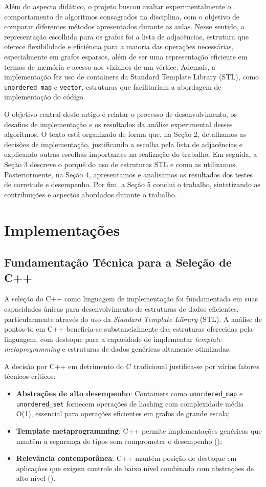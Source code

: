 \documentclass{sbc2023}%
\begin{document}
Além do aspecto didático, o projeto buscou avaliar experimentalmente o comportamento de algoritmos consagrados na disciplina, com o objetivo de comparar diferentes métodos apresentados durante as aulas. Nesse sentido, a representação escolhida para os grafos foi a lista de adjacências, estrutura que oferece flexibilidade e eficiência para a maioria das operações necessárias, especialmente em grafos esparsos, além de ser uma representação eficiente em termos de memória e acesso aos vizinhos de um vértice. Ademais, a implementação fez uso de containers da Standard Template Library (STL), como \texttt{unordered\_map} e \texttt{vector}, estruturas que facilitariam a abordagem de implementação do código.

O objetivo central deste artigo é relatar o processo de desenvolvimento, os desafios de implementação e os resultados da análise experimental desses algoritmos. O texto está organizado de forma que, na Seção 2, detalhamos as decisões de implementação, justificando a escolha pela lista de adjacências e explicando outras escolhas importantes na realização do trabalho. Em seguida, a Seção 3 descreve o porquê do uso de estruturas STL e como as utilizamos. Posteriormente, na Seção 4, apresentamos e analisamos os resultados dos testes de corretude e desempenho. Por fim, a Seção 5 conclui o trabalho, sintetizando as contribuições e aspectos abordados durante o trabalho.


\section{Implementações}
\subsection{Fundamentação Técnica para a Seleção de C++}

A seleção do C++ como linguagem de implementação foi fundamentada em suas capacidades únicas para desenvolvimento de estruturas de dados eficientes, particularmente através do uso da \textit{Standard Template Library} (STL). A análise de pontos-to em C++ beneficia-se substancialmente das estruturas oferecidas pela linguagem, com destaque para a capacidade de implementar \textit{template metaprogramming} e estruturas de dados genéricas altamente otimizadas.\cite{ref2}

A decisão por C++ em detrimento do C tradicional justifica-se por vários fatores técnicos críticos:

\begin{itemize}
\item \textbf{Abstrações de alto desempenho}: Containers como  \texttt{unordered\_map} e  \texttt{unordered\_set} fornecem operações de hashing com complexidade média O(1), essencial para operações eficientes em grafos de grande escala;
\item \textbf{Template metaprogramming}: C++ permite implementações genéricas que mantêm a segurança de tipos sem comprometer o desempenho (\cite{ref2});
\item \textbf{Relevância contemporânea}: C++ mantém posição de destaque em aplicações que exigem controle de baixo nível combinado com abstrações de alto nível (\cite{ref4}).
\end{itemize}
\end{document}
